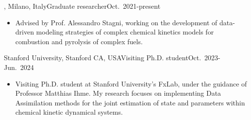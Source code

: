 \begin{position}{\polimi, Milano, Italy}{Graduate researcher}{Oct.~2021-present}
   \begin{itemize}
      \item[ ] Advised by Prof. Alessandro Stagni, working on the development of
         data-driven modeling strategies of complex chemical kinetics models for
         combustion and pyrolysis of complex fuels.
   \end{itemize}
\end{position}

\begin{position}{Stanford University, Stanford CA, USA}{Visiting Ph.D. student}{Oct.~2023-Jun.~2024}
   \begin{itemize}
      \item[ ] Visiting Ph.D. student at Stanford University's FxLab, under the guidance of
         Professor Matthias Ihme. My research focuses on implementing Data Assimilation
         methods for the joint estimation of state and parameters within chemical kinetic
         dynamical systems.
   \end{itemize}
\end{position}
